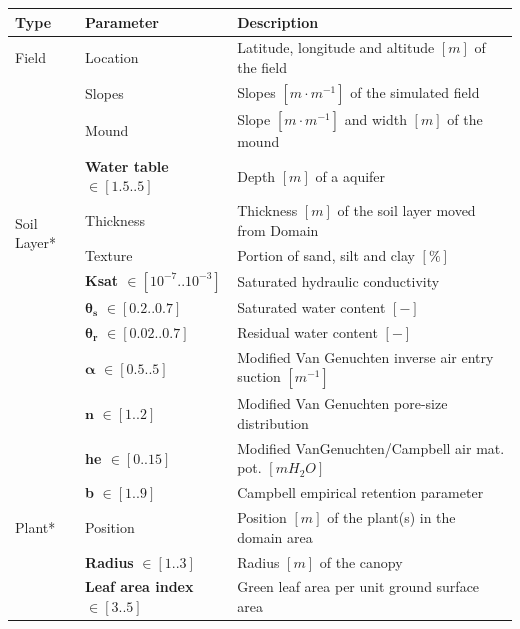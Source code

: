\begin{table}[H]
	\centering
	\scriptsize
	\begin{tabular}{p{1.2cm}p{5cm}p{7.5cm}}
 		\textbf{Type} & \textbf{Parameter} & \textbf{Description} \\
		\hline%
		Field & Location &  Latitude, longitude and altitude $[m]$ of the field\\
		& Slopes & Slopes $[m \cdot m^{-1}]$ of the simulated field \\
		& Mound & Slope $[m \cdot m^{-1}]$ and width $[m]$ of the mound \\
		& \textbf{Water table} $\in [1.5..5]$ & Depth $[m]$ of a aquifer\\ 
		\hline%
		\multirow{2}{1cm}{Soil Layer*} & Thickness & Thickness $[m]$ of the soil layer moved from Domain\\
		& Texture & Portion of sand, silt and clay $[\%]$ \\ %
		& \textbf{Ksat $\in [10^{-7}..10^{-3}]$ } & Saturated hydraulic conductivity  \\ %
		& $\pmb{\theta_s}$ $\in [0.2..0.7]$ & Saturated water content $[-]$\\  
		& $\pmb{\theta_r}$ $\in [0.02..0.7]$ & Residual water content $[-]$ \\  
		& $\pmb{\alpha}$ $\in [0.5..5]$ & Modified Van Genuchten inverse air entry suction $[m^{-1}]$\\  
		& $\mathbf{n}$ $\in [1..2]$ & Modified Van Genuchten pore-size distribution\\
		& \textbf{he $\in [0..15]$} & Modified VanGenuchten/Campbell air mat. pot. $[m H_2O]$ \\ 
		& \textbf{b} $\in [1..9]$ & Campbell empirical retention parameter\\ 
		\hline%
		Plant* & Position & Position $[m]$ of the plant(s) in the domain area\\
		& \textbf{Radius} $\in [1..3]$ & Radius $[m]$ of the canopy \\
		& \textbf{Leaf area index} $\in [3..5]$ & Green leaf area per unit ground surface area\\ %

\end{tabular}
\end{table}
